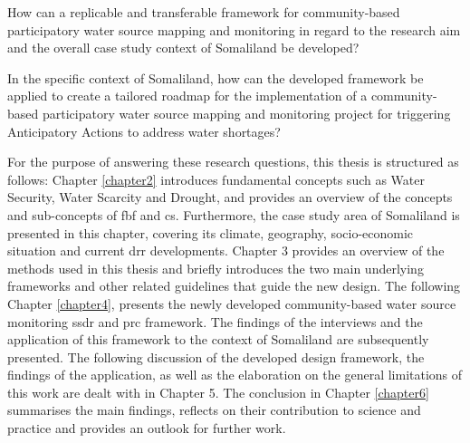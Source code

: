 
\begin{questions}
    \item How can a replicable and transferable framework for community-based participatory water source mapping and monitoring in regard to the research aim and the overall case study context of Somaliland be developed?
    \item In the specific context of Somaliland, how can the developed framework be applied to create a tailored roadmap for the implementation of a community-based participatory water source mapping and monitoring project for triggering Anticipatory Actions to address water shortages?
\end{questions}

\noindent For the purpose of answering these research questions, this thesis is structured as follows: Chapter \ref{chapter2} introduces fundamental concepts such as Water Security, Water Scarcity and Drought, and provides an overview of the concepts and sub-concepts of \acrshort{fbf} and \acrshort{cs}. Furthermore, the case study area of Somaliland is presented in this chapter, covering its climate, geography, socio-economic situation and current \acrlong{drr} developments. Chapter 3 provides an overview of the methods used in this thesis and briefly introduces the two main underlying frameworks and other related guidelines that guide the new design. The following Chapter \ref{chapter4}, presents the newly developed community-based water source monitoring \acrfull{ssdr} and \acrfull{prc} framework. The findings of the interviews and the application of this framework to the context of Somaliland are subsequently presented. The following discussion of the developed design framework, the findings of the application, as well as the elaboration on the general limitations of this work are dealt with in Chapter 5. The conclusion in Chapter \ref{chapter6} summarises the main findings, reflects on their contribution to science and practice and provides an outlook for further work.
